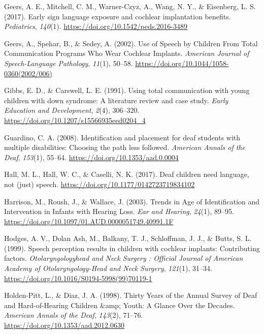 \documentclass[english,man]{apa6}
\begin{document}
\leavevmode\hypertarget{ref-geers2017}{}%
Geers, A. E., Mitchell, C. M., Warner-Czyz, A., Wang, N. Y., \& Eisenberg, L. S. (2017). Early sign language exposure and cochlear implantation benefits. \emph{Pediatrics}, \emph{140}(1). \url{https://doi.org/10.1542/peds.2016-3489}

\leavevmode\hypertarget{ref-geers2002}{}%
Geers, A., Spehar, B., \& Sedey, A. (2002). Use of Speech by Children From Total Communication Programs Who Wear Cochlear Implants. \emph{American Journal of Speech-Language Pathology}, \emph{11}(1), 50--58. \url{https://doi.org/10.1044/1058-0360(2002/006)}

\leavevmode\hypertarget{ref-gibbs1991}{}%
Gibbs, E. D., \& Carswell, L. E. (1991). Using total communication with young children with down syndrome: A literature review and case study. \emph{Early Education and Development}, \emph{2}(4), 306--320. \url{https://doi.org/10.1207/s15566935eed0204_4}

\leavevmode\hypertarget{ref-guardino2008}{}%
Guardino, C. A. (2008). Identification and placement for deaf students with multiple disabilities: Choosing the path less followed. \emph{American Annals of the Deaf}, \emph{153}(1), 55--64. \url{https://doi.org/10.1353/aad.0.0004}

\leavevmode\hypertarget{ref-hall2017}{}%
Hall, M. L., Hall, W. C., \& Caselli, N. K. (2017). Deaf children need language, not (just) speech. \url{https://doi.org/10.1177/0142723719834102}

\leavevmode\hypertarget{ref-harrison2003}{}%
Harrison, M., Roush, J., \& Wallace, J. (2003). Trends in Age of Identification and Intervention in Infants with Hearing Loss. \emph{Ear and Hearing}, \emph{24}(1), 89--95. \url{https://doi.org/10.1097/01.AUD.0000051749.40991.1F}

\leavevmode\hypertarget{ref-hodges1999}{}%
Hodges, A. V., Dolan Ash, M., Balkany, T. J., Schloffman, J. J., \& Butts, S. L. (1999). Speech perception results in children with cochlear implants: Contributing factors. \emph{Otolaryngologyhead and Neck Surgery : Official Journal of American Academy of Otolaryngology-Head and Neck Surgery}, \emph{121}(1), 31--34. \url{https://doi.org/10.1016/S0194-5998(99)70119-1}

\leavevmode\hypertarget{ref-holden-pitt1998}{}%
Holden-Pitt, L., \& Diaz, J. A. (1998). Thirty Years of the Annual Survey of Deaf and Hard-of-Hearing Children \&amp; Youth: A Glance Over the Decades. \emph{American Annals of the Deaf}, \emph{143}(2), 71--76. \url{https://doi.org/10.1353/aad.2012.0630}
\end{document}
